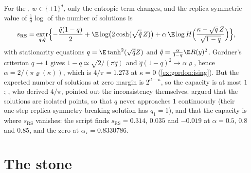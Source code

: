 \begin{refsection}
For the , $w\in\{\pm1\}^d$, only the entropic term changes, and the replica-symmetric value of $\frac1d\log$ of the number of solutions is \parencite[eq.~(2)]{AubinPerkinsZdeborova2019}
\begin{equation}\label{eq:gordon:isingRS}
s_{\mathrm{RS}}=\operatorname*{extr}_{q,\hat q}\Bigl\{-\frac{\hat q(1-q)}2+\E\log\bigl(2\cosh(\sqrt{\hat q}\,Z)\bigr)+\alpha\,\E\log H\Bigl(\frac{\kappa-\sqrt q\,Z}{\sqrt{1-q}}\Bigr)\Bigr\},
\end{equation}
with stationarity equations $q=\E\tanh^2(\sqrt{\hat q}Z)$ and $\hat q=\frac\alpha{1-q}\E R(y)^2$. Gardner's criterion $q\to1$ gives $1-q\simeq\sqrt{2/(\pi\hat q)}$ and $\hat q(1-q)^2\to\alpha\varrho$, hence $\alpha=2/(\pi\varrho(\kappa))$, which is $4/\pi=1.273$ at $\kappa=0$ (\cref{ex:gordon:ising}). But the expected number of solutions at zero margin is $2^{d-n}$, so the capacity is at most $1$; \textcite{GardnerDerrida1988}, who derived $4/\pi$, pointed out the inconsistency themselves. \Textcite{KrauthMezard1989} argued that the solutions are isolated points, so that $q$ never approaches $1$ continuously (their one-step replica-symmetry-breaking solution has $q_1=1$), and that the capacity is where $s_{\mathrm{RS}}$ vanishes: the script finds $s_{\mathrm{RS}}=0.314$, $0.035$ and $-0.019$ at $\alpha=0.5$, $0.8$ and $0.85$, and the zero at $\alpha_\star=0.8330786$.

\section{The stone}\label{sec:gordon:stone}


\end{refsection}
